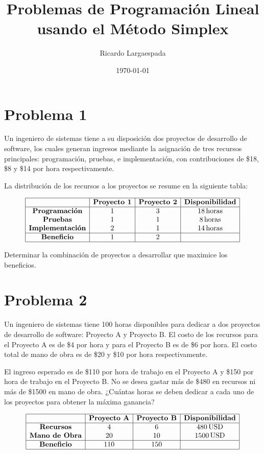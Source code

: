 \documentclass{article}
\title{Problemas de Programación Lineal usando el Método Simplex}
\author{Ricardo Largaespada}
\date{\today}
\begin{document}
\maketitle

\section*{Problema 1}

Un ingeniero de sistemas tiene a su disposición dos proyectos de desarrollo de software, los cuales generan ingresos mediante la asignación de tres recursos principales: programación, pruebas, e implementación, con contribuciones de \$18, \$8 y \$14 por hora respectivamente.

La distribución de los recursos a los proyectos se resume en la siguiente tabla:

\[
\begin{array}{|c|c|c|c|}
\hline
 & \textbf{Proyecto 1} & \textbf{Proyecto 2} & \textbf{Disponibilidad} \\
\hline
\textbf{Programación} & 1 & 3 & 18 \, \text{horas} \\
\textbf{Pruebas} & 1 & 1 & 8 \, \text{horas} \\
\textbf{Implementación} & 2 & 1 & 14 \, \text{horas} \\
\hline
\textbf{Beneficio} & 1 & 2 & \\
\hline
\end{array}
\]

Determinar la combinación de proyectos a desarrollar que maximice los beneficios.

\section{Problema 2}

Un ingeniero de sistemas tiene 100 horas disponibles para dedicar a dos proyectos de desarrollo de software: Proyecto A y Proyecto B. El costo de los recursos para el Proyecto A es de \$4 por hora y para el Proyecto B es de \$6 por hora. El costo total de mano de obra es de \$20 y \$10 por hora respectivamente.

El ingreso esperado es de \$110 por hora de trabajo en el Proyecto A y \$150 por hora de trabajo en el Proyecto B. No se desea gastar más de \$480 en recursos ni más de \$1500 en mano de obra. ¿Cuántas horas se deben dedicar a cada uno de los proyectos para obtener la máxima ganancia?

\[
\begin{array}{|c|c|c|c|}
\hline
 & \textbf{Proyecto A} & \textbf{Proyecto B} & \textbf{Disponibilidad} \\
\hline
\textbf{Recursos} & 4 & 6 & 480 \, \text{USD} \\
\textbf{Mano de Obra} & 20 & 10 & 1500 \, \text{USD} \\
\hline
\textbf{Beneficio} & 110 & 150 & \\
\hline
\end{array}
\]
\end{document}
